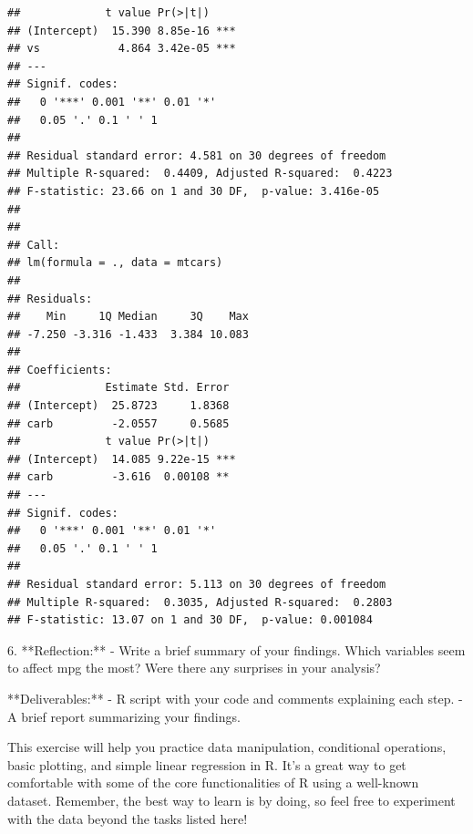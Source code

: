 \documentclass[11pt]{article}\usepackage[]{graphicx}\usepackage[]{xcolor}
\makeatletter
\newenvironment{kframe}{%
 \def\at@end@of@kframe{}%
 \ifinner\ifhmode%
  \def\at@end@of@kframe{\end{minipage}}%
  \begin{minipage}{\columnwidth}%
 \fi\fi%
 \def\FrameCommand##1{\hskip\@totalleftmargin \hskip-\fboxsep
 \colorbox{shadecolor}{##1}\hskip-\fboxsep
     \hskip-\linewidth \hskip-\@totalleftmargin \hskip\columnwidth}%
 \MakeFramed {\advance\hsize-\width
   \@totalleftmargin\z@ \linewidth\hsize
   \@setminipage}}%
 {\par\unskip\endMakeFramed%
 \at@end@of@kframe}
\newenvironment{knitrout}{}{} %
\makeatother
\begin{document}
\begin{knitrout}
\begin{kframe}
\begin{verbatim}
##             t value Pr(>|t|)    
## (Intercept)  15.390 8.85e-16 ***
## vs            4.864 3.42e-05 ***
## ---
## Signif. codes:  
##   0 '***' 0.001 '**' 0.01 '*'
##   0.05 '.' 0.1 ' ' 1
## 
## Residual standard error: 4.581 on 30 degrees of freedom
## Multiple R-squared:  0.4409,	Adjusted R-squared:  0.4223 
## F-statistic: 23.66 on 1 and 30 DF,  p-value: 3.416e-05
## 
## 
## Call:
## lm(formula = ., data = mtcars)
## 
## Residuals:
##    Min     1Q Median     3Q    Max 
## -7.250 -3.316 -1.433  3.384 10.083 
## 
## Coefficients:
##             Estimate Std. Error
## (Intercept)  25.8723     1.8368
## carb         -2.0557     0.5685
##             t value Pr(>|t|)    
## (Intercept)  14.085 9.22e-15 ***
## carb         -3.616  0.00108 ** 
## ---
## Signif. codes:  
##   0 '***' 0.001 '**' 0.01 '*'
##   0.05 '.' 0.1 ' ' 1
## 
## Residual standard error: 5.113 on 30 degrees of freedom
## Multiple R-squared:  0.3035,	Adjusted R-squared:  0.2803 
## F-statistic: 13.07 on 1 and 30 DF,  p-value: 0.001084
\end{verbatim}
\end{kframe}
\end{knitrout}

6. **Reflection:**
   - Write a brief summary of your findings. Which variables seem to affect mpg the most? Were there any surprises in your analysis?

**Deliverables:**
- R script with your code and comments explaining each step.
- A brief report summarizing your findings.

This exercise will help you practice data manipulation, conditional operations, basic plotting, and simple linear regression in R. It's a great way to get comfortable with some of the core functionalities of R using a well-known dataset. Remember, the best way to learn is by doing, so feel free to experiment with the data beyond the tasks listed here!
\end{document}
